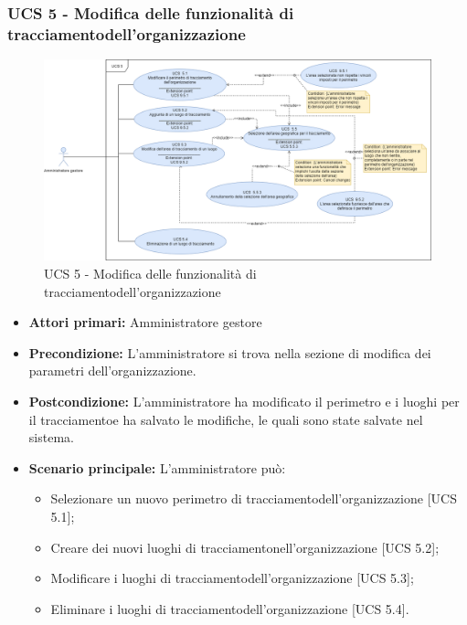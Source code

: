 \subsubsection{UCS 5 - Modifica delle funzionalità di tracciamentodell'organizzazione}%
\begin{figure}[h]
	\centering
    \includegraphics[scale=0.40]{sezioni/UseCase/Immagini/UCS5.png}
    \caption{UCS 5 - Modifica delle funzionalità di tracciamentodell'organizzazione}
\end{figure}
\begin{itemize}
    \item \textbf{Attori primari:} Amministratore gestore
    \item \textbf{Precondizione:} L'amministratore si trova nella sezione di modifica dei parametri dell'organizzazione.
    \item \textbf{Postcondizione:} L'amministratore ha modificato il perimetro e i luoghi per il tracciamentoe ha salvato le modifiche, le quali sono state salvate nel sistema.
    \item \textbf{Scenario principale:} L'amministratore può:
    \begin{itemize}    
        \item Selezionare un nuovo perimetro di tracciamentodell'organizzazione [UCS 5.1];
        \item Creare dei nuovi luoghi di tracciamentonell'organizzazione [UCS 5.2];
        \item Modificare i luoghi di tracciamentodell'organizzazione [UCS 5.3];
        \item Eliminare i luoghi di tracciamentodell'organizzazione [UCS 5.4].
    \end{itemize}
\end{itemize}

